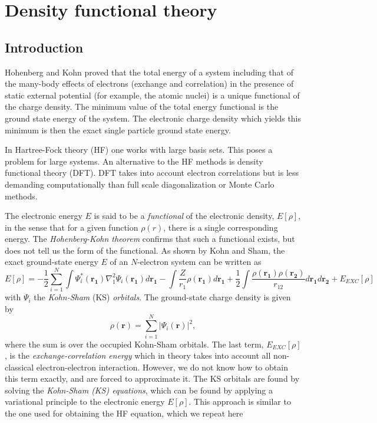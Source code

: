 \chapter{Density functional theory}

\section{Introduction}
Hohenberg and Kohn proved that the total energy of a system including that of the many-body 
effects of electrons (exchange and correlation) in the presence of static external potential (for example, the atomic nuclei) 
is a unique functional of the charge density. The minimum value of the total energy functional 
is the ground state energy of the system. The electronic charge density which yields this 
minimum is then the exact single particle ground state energy.

In Hartree-Fock theory  (HF) one works with large basis sets. This
poses a problem for large systems. An alternative to the HF methods is
density functional theory (DFT). DFT  takes into 
account electron correlations but is less demanding computationally
than full scale diagonalization or Monte Carlo methods.

The electronic energy $E$ is said to be a \emph{functional} of the
electronic density, $E[\rho]$, in the sense that for a given function
$\rho(r)$, there is a single corresponding energy. The  
\emph{Hohenberg-Kohn theorem} confirms that such
a functional exists, but does not tell us the form of the
functional. As shown by Kohn and Sham, the exact ground-state energy
$E$ of an $N$-electron system can be written as
\begin{equation*}
  E[\rho] = -\frac{1}{2} \sum_{i=1}^N\int
  \Psi_i^*(\mathbf{r_1})\nabla_1^2 \Psi_i(\mathbf{r_1}) d\mathbf{r_1}
  - \int \frac{Z}{r_1} \rho(\mathbf{r_1}) d\mathbf{r_1} +
  \frac{1}{2} \int\frac{\rho(\mathbf{r_1})\rho(\mathbf{r_2})}{r_{12}}
  d\mathbf{r_1}d\mathbf{r_2} + E_{EXC}[\rho]
\end{equation*}
with $\Psi_i$ the \emph{Kohn-Sham} (KS) \emph{orbitals}.
 The ground-state charge density is given by
\begin{equation*}
  \rho(\mathbf{r}) = \sum_{i=1}^N|\Psi_i(\mathbf{r})|^2, 
\end{equation*}
where the sum is over the occupied Kohn-Sham orbitals. The last term,
$E_{EXC}[\rho]$, is the \emph{exchange-correlation energy} which in
theory takes into account all non-classical electron-electron
interaction. However, we do not know how to obtain this term exactly,
and are forced to approximate it. The KS orbitals are found by solving
the \emph{Kohn-Sham (KS) equations}, which can be found by applying a
variational principle to the electronic energy $E[\rho]$. This approach
is similar to the one used for obtaining the HF equation, which we repeat here

